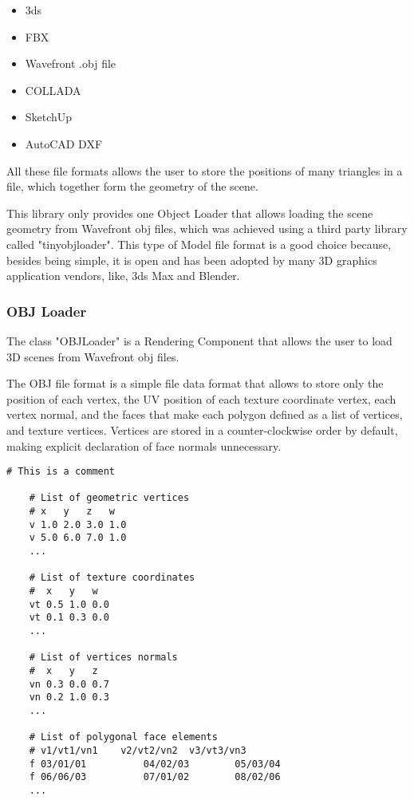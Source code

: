 \begin{itemize}
	\item 3ds
	\item FBX
	\item Wavefront .obj file
	\item COLLADA
	\item SketchUp
	\item AutoCAD DXF
\end{itemize}

\par
All these file formats allows the user to store the positions of many triangles in a file, which together form the geometry of the scene.

\par
This library only provides one Object Loader that allows loading the scene geometry from Wavefront obj files, which was achieved using a third party library called "tinyobjloader".
This type of Model file format is a good choice because, besides being simple, it is open and has been adopted by many 3D graphics application vendors, like, 3ds Max and Blender.

\subsubsection{OBJ Loader}

\par
The class "OBJLoader" is a Rendering Component that allows the user to load 3D scenes from Wavefront obj files.

\par
The OBJ file format is a simple file data format that allows to store only the position of each vertex, the UV position of each texture coordinate vertex, each vertex normal, and the faces that make each polygon defined as a list of vertices, and texture vertices.
Vertices are stored in a counter-clockwise order by default, making explicit declaration of face normals unnecessary.

\begin{lstlisting}[caption={.OBJ file format}, captionpos=b, label=OBJ]
	# This is a comment

	# List of geometric vertices
	# x   y   z   w
	v 1.0 2.0 3.0 1.0
	v 5.0 6.0 7.0 1.0
	...
	
	# List of texture coordinates
	#  x   y   w
	vt 0.5 1.0 0.0
	vt 0.1 0.3 0.0
	...
	
	# List of vertices normals
	#  x   y   z
	vn 0.3 0.0 0.7
	vn 0.2 1.0 0.3
	...
	
	# List of polygonal face elements
	# v1/vt1/vn1	v2/vt2/vn2	v3/vt3/vn3
	f 03/01/01			04/02/03		05/03/04
	f 06/06/03			07/01/02		08/02/06
	...
\end{lstlisting}

